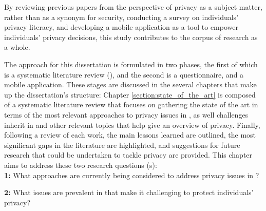 By reviewing previous papers from the perspective of privacy as a subject matter,
rather than as a synonym for security, conducting a survey on individuals' privacy literacy,
and developing a mobile application as a tool to empower individuals' privacy decisions,
this study contributes to the corpus of research as a whole.

The approach for this dissertation is formulated in two phases, the first of
which is a systematic literature review (\hyperlink{\acronym}{\acronym}), and the second is a questionnaire, and
a mobile application. These stages are discussed
in the several chapters that make up the dissertation's structure: Chapter \ref{section:state_of_the_art}
is composed of a systematic literature review that focuses on gathering the state
of the art in terms of the most relevant approaches to privacy issues in \hyperlink{\acronym}{\acronym}, as
well challenges inherit in \hyperlink{\acronym}{\acronym} and other relevant topics that help give an
overview of \hyperlink{\acronym}{\acronym} privacy. Finally, following a review of each work, the main lessons
learned are outlined, the most significant gaps in the literature are highlighted,
and suggestions for future research that could be undertaken to tackle \hyperlink{\acronym}{\acronym} privacy
are provided. This chapter aims to address these two research questions (\hyperlink{\acronym}{\acronym}s):\\


\textbf{\hyperlink{\acronym}{\acronym}1:} What approaches are currently being considered to address privacy
issues in \hyperlink{\acronym}{\acronym}?

\textbf{\hyperlink{\acronym}{\acronym}2:} What issues are prevalent in \hyperlink{\acronym}{\acronym} that make it challenging to
protect individuals' privacy? \\

